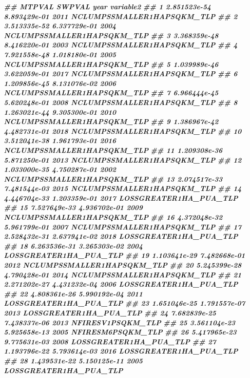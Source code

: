 \documentclass[10pt,landscape,a3paper]{article}
\newenvironment{Shaded}{\begin{snugshade}}{\end{snugshade}}
\newcommand{\DocumentationTok}[1]{\textcolor[rgb]{0.56,0.35,0.01}{\textbf{\textit{#1}}}}
\begin{document}
\begin{Shaded}
\begin{Highlighting}[]
\DocumentationTok{\#\#          MTPVAL       SWPVAL year                  variable2}
\DocumentationTok{\#\# 1  2.851523e{-}54 8.893429e{-}01 2011 NCLUMPSSMALLER1HAPSQKM\_TLP}
\DocumentationTok{\#\# 2  3.513335e{-}52 6.337729e{-}01 2004 NCLUMPSSMALLER1HAPSQKM\_TLP}
\DocumentationTok{\#\# 3  3.368359e{-}48 8.416220e{-}01 2003 NCLUMPSSMALLER1HAPSQKM\_TLP}
\DocumentationTok{\#\# 4  7.921558e{-}48 1.018180e{-}01 2005 NCLUMPSSMALLER1HAPSQKM\_TLP}
\DocumentationTok{\#\# 5  1.039989e{-}46 3.622059e{-}01 2017 NCLUMPSSMALLER1HAPSQKM\_TLP}
\DocumentationTok{\#\# 6  1.209856e{-}45 8.131076e{-}02 2006 NCLUMPSSMALLER1HAPSQKM\_TLP}
\DocumentationTok{\#\# 7  6.966444e{-}45 5.620248e{-}01 2008 NCLUMPSSMALLER1HAPSQKM\_TLP}
\DocumentationTok{\#\# 8  1.263021e{-}44 9.305300e{-}01 2010 NCLUMPSSMALLER1HAPSQKM\_TLP}
\DocumentationTok{\#\# 9  1.386967e{-}42 4.482731e{-}01 2018 NCLUMPSSMALLER1HAPSQKM\_TLP}
\DocumentationTok{\#\# 10 3.512041e{-}38 1.961793e{-}01 2016 NCLUMPSSMALLER1HAPSQKM\_TLP}
\DocumentationTok{\#\# 11 1.209308e{-}36 5.871250e{-}01 2013 NCLUMPSSMALLER1HAPSQKM\_TLP}
\DocumentationTok{\#\# 12 1.033000e{-}35 4.750287e{-}01 2002 NCLUMPSSMALLER1HAPSQKM\_TLP}
\DocumentationTok{\#\# 13 2.074517e{-}33 7.481544e{-}03 2015 NCLUMPSSMALLER1HAPSQKM\_TLP}
\DocumentationTok{\#\# 14 4.446704e{-}33 1.203359e{-}01 2017     LOSSGREATER1HA\_PUA\_TLP}
\DocumentationTok{\#\# 15 7.527649e{-}33 4.936702e{-}01 2009 NCLUMPSSMALLER1HAPSQKM\_TLP}
\DocumentationTok{\#\# 16 4.372048e{-}32 5.961799e{-}01 2007 NCLUMPSSMALLER1HAPSQKM\_TLP}
\DocumentationTok{\#\# 17 2.528432e{-}31 2.637941e{-}02 2018     LOSSGREATER1HA\_PUA\_TLP}
\DocumentationTok{\#\# 18 6.263536e{-}31 3.265303e{-}02 2004     LOSSGREATER1HA\_PUA\_TLP}
\DocumentationTok{\#\# 19 1.103641e{-}29 7.482668e{-}01 2012 NCLUMPSSMALLER1HAPSQKM\_TLP}
\DocumentationTok{\#\# 20 5.245399e{-}28 4.790428e{-}01 2014 NCLUMPSSMALLER1HAPSQKM\_TLP}
\DocumentationTok{\#\# 21 2.271202e{-}27 4.431232e{-}04 2006     LOSSGREATER1HA\_PUA\_TLP}
\DocumentationTok{\#\# 22 4.808361e{-}26 5.990192e{-}04 2011     LOSSGREATER1HA\_PUA\_TLP}
\DocumentationTok{\#\# 23 1.651046e{-}25 1.791557e{-}07 2013     LOSSGREATER1HA\_PUA\_TLP}
\DocumentationTok{\#\# 24 7.682839e{-}25 7.438337e{-}06 2013          NFIRESV1PSQKM\_TLP}
\DocumentationTok{\#\# 25 3.561104e{-}23 5.925658e{-}13 2005          NFIRESM6PSQKM\_TLP}
\DocumentationTok{\#\# 26 5.417965e{-}23 9.775631e{-}03 2008     LOSSGREATER1HA\_PUA\_TLP}
\DocumentationTok{\#\# 27 1.193796e{-}22 5.793614e{-}03 2016     LOSSGREATER1HA\_PUA\_TLP}
\DocumentationTok{\#\# 28 1.439531e{-}22 5.150125e{-}11 2005     LOSSGREATER1HA\_PUA\_TLP}

\end{Highlighting}
\end{Shaded}
\end{document}
